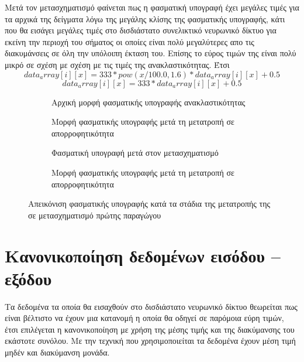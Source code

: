 Μετά τον μετασχηματισμό  φαίνεται πως η φασματική υπογραφή έχει μεγάλες τιμές για τα αρχικά της δείγματα λόγω της μεγάλης κλίσης της φασματικής υπογραφής, κάτι που θα εισάγει μεγάλες τιμές στο δισδιάστατο συνελικτικό νευρωνικό δίκτυο για εκείνη την περιοχή του σήματος οι οποίες είναι πολύ μεγαλύτερες απο τις διακυμάνσεις σε όλη την υπόλοιπη έκταση του. Επίσης το εύρος τιμών της είναι πολύ μικρό σε σχέση με σχέση με τις τιμές της ανακλαστικότητας. Έτσι 
$$data_array[i][x] = 333 * pow(x / 100.0, 1.6) * data_array[i][x] + 0.5$$
$$data_array[i][x] = 333 * data_array[i][x] + 0.5$$
\begin{figure}[htbp]
    \begin{subfigure}{0.5\textwidth}
        
        \caption{Αρχική μορφή φασματικής υπογραφής ανακλαστικότητας}
        \label{fig:abs_sg1_initial}
    \end{subfigure}
    \begin{subfigure}{0.5\textwidth}
        
        \caption{Μορφή φασματικής υπογραφής μετά τη μετατροπή σε απορροφητικότητα}
        \label{fig:abs_sg1_abs}
    \end{subfigure}
    \begin{subfigure}{0.5\textwidth}
        
        \caption{Φασματική υπογραφή μετά στον μετασχηματισμό \tl{}}
        \label{fig:abs_sg1_transform_notches}
    \end{subfigure}
    \begin{subfigure}{0.5\textwidth}
        
        \caption{Μορφή φασματικής υπογραφής μετά τη μετατροπή σε απορροφητικότητα}
        \label{fig:abs_sg1_transform_fixed}
    \end{subfigure}
    \caption{Απεικόνιση φασματικής υπογραφής κατά τα στάδια της μετατροπής της σε μετασχηματισμό  πρώτης παραγώγου}
\end{figure}


\section{Κανονικοποίηση δεδομένων εισόδου -- εξόδου}
Τα δεδομένα τα οποία θα εισαχθούν στο δισδιάστατο νευρωνικό δίκτυο θεωρείται πως είναι βέλτιστο να έχουν μια κατανομή η οποία θα οδηγεί σε παρόμοια εύρη τιμών, έτσι επιλέγεται η κανονικοποίηση με χρήση της μέσης τιμής και της διακύμανσης του εκάστοτε συνόλου. Με την τεχνική που χρησιμοποιείται τα δεδομένα έχουν μέση τιμή μηδέν και διακύμανση μονάδα.

